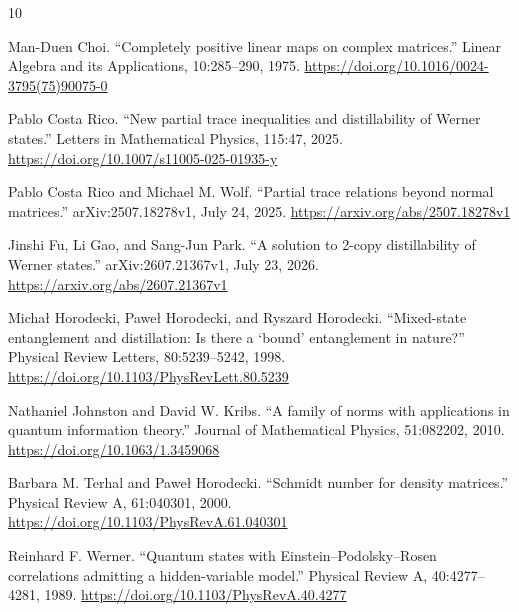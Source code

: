 \documentclass[11pt,reqno]{amsart}
\theoremstyle{remark}
\begin{document}
\begin{thebibliography}{10}

Man-Duen Choi.
``Completely positive linear maps on complex matrices.''
\newblock Linear Algebra and its Applications, 10:285--290, 1975.
\newblock \url{https://doi.org/10.1016/0024-3795(75)90075-0}

Pablo Costa Rico.
``New partial trace inequalities and distillability of Werner states.''
\newblock Letters in Mathematical Physics, 115:47, 2025.
\newblock \url{https://doi.org/10.1007/s11005-025-01935-y}

Pablo Costa Rico and Michael M. Wolf.
``Partial trace relations beyond normal matrices.''
\newblock arXiv:2507.18278v1, July 24, 2025.
\newblock \url{https://arxiv.org/abs/2507.18278v1}

Jinshi Fu, Li Gao, and Sang-Jun Park.
``A solution to 2-copy distillability of Werner states.''
\newblock arXiv:2607.21367v1, July 23, 2026.
\newblock \url{https://arxiv.org/abs/2607.21367v1}

Micha\l{} Horodecki, Pawe\l{} Horodecki, and Ryszard Horodecki.
``Mixed-state entanglement and distillation: Is there a `bound'
entanglement in nature?''
\newblock Physical Review Letters, 80:5239--5242, 1998.
\newblock \url{https://doi.org/10.1103/PhysRevLett.80.5239}

Nathaniel Johnston and David W. Kribs.
``A family of norms with applications in quantum information theory.''
\newblock Journal of Mathematical Physics, 51:082202, 2010.
\newblock \url{https://doi.org/10.1063/1.3459068}

Barbara M. Terhal and Pawe\l{} Horodecki.
``Schmidt number for density matrices.''
\newblock Physical Review A, 61:040301, 2000.
\newblock \url{https://doi.org/10.1103/PhysRevA.61.040301}

Reinhard F. Werner.
``Quantum states with Einstein--Podolsky--Rosen correlations admitting a
hidden-variable model.''
\newblock Physical Review A, 40:4277--4281, 1989.
\newblock \url{https://doi.org/10.1103/PhysRevA.40.4277}

\end{thebibliography}
\end{document}
